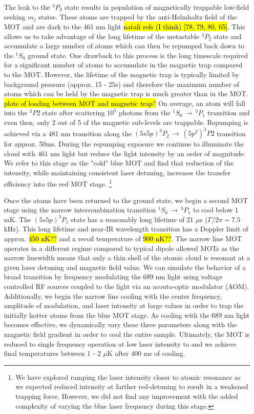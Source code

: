 The leak to the $^3P_2$ state results in population of magnetically trappable low-field seeking $m_j$ states. 
These atoms are trapped by the anti-Helmholtz field of the MOT and are dark to the 461 nm light \hl{natali refs (I think) [78, 79, 80, 65]}.
This allows us to take advantage of the long lifetime of the metastable $^3P_2$ state and accumulate a large number of atoms which can then be repumped back down to the $^1S_0$ ground state.
One drawback to this process is the long timescale required for a significant number of atoms to accumulate in the magnetic trap compared to the MOT.
However, the lifetime of the magnetic trap is typically limited by background pressure (approx. 15 - 25s) and therefore the maximum number of atoms which can be held by the magnetic trap is much greater than in the MOT. \hl{plots of loading between MOT and magnetic trap?}
On average, an atom will fall into the $^3P2$ state after scattering $10^5$ photons from the $^1S_0\,\rightarrow\,^3P_1$ transition and even then, only 2 out of 5 of the magnetic sub-levels are trappable.
Repumping is achieved via a 481 nm transition along the $(5s5p)^3P_2\,\rightarrow\,(5p^2)^3P2$ transition for approx. 50ms.
During the repumping exposure we continue to illuminate the cloud with 461 nm light but reduce the light intensity by an order of magnitude.
We refer to this stage as the "cold" blue MOT and find that reduction of the intensity, while maintaining consistent laser detuning, increases the transfer efficiency into the red MOT stage.
\footnote{We have explored ramping the laser intensity closer to atomic resonance as we expected reduced intensity at farther red-detuning to result in a weakened trapping force.
However, we did not find any improvement with the added complexity of varying the blue laser frequency during this stage.}

Once the atoms have been returned to the ground state, we begin a second MOT stage using the narrow intercombination transition $^1S_0\,\rightarrow\,^3P_1$ to cool below 1 mK.
The $(5s5p)^3P_1$ state has a reasonably long lifetime of 21 $\mu$s ($\Gamma/2\pi=7.5$ kHz).
This long lifetime and near-IR wavelength transition has a Doppler limit of approx. \hl{450 nK??} and a recoil temperature of \hl{900 nK??}.
The narrow line MOT operates in a different regime compared to typical dipole allowed MOTs as the narrow linewidth means that only a thin shell of the atomic cloud is resonant at a given laser detuning and magnetic field value.
We can simulate the behavior of a broad transition by frequency modulating the 689 nm light using voltage controlled RF sources coupled to the light via an acouto-optic modulator (AOM). 
Additionally, we begin the narrow line cooling with the center frequency, amplitude of modulation, and laser intensity at large values in order to trap the initially hotter atoms from the blue MOT stage. 
As cooling with the 689 nm light becomes effective, we dynamically vary these three parameters along with the magnetic field gradient in order to cool the entire sample.
Ultimately, the MOT is reduced to single frequency operation at low laser intensity to and we achieve final temperatures between 1 - 2 $\mu$K after 400 ms of cooling.

